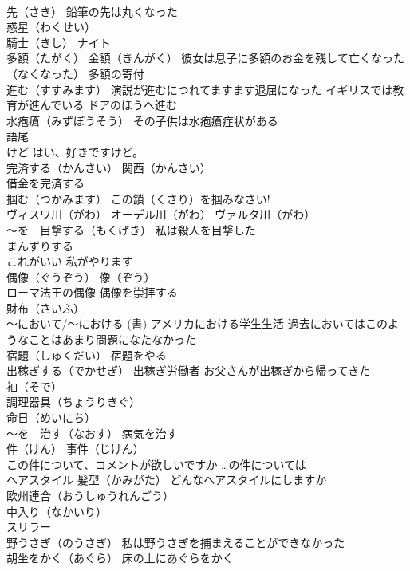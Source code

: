 \documentclass[8pt]{extreport}
\begin{document}
\begin{CJK}{UTF8}{min}
\\	先（さき） 鉛筆の先は丸くなった
\\	惑星（わくせい） 
\\	騎士（きし） ナイト
\\	多額（たがく） 金額（きんがく） 彼女は息子に多額のお金を残して亡くなった（なくなった） 多額の寄付
\\	進む（すすみます） 演説が進むにつれてますます退屈になった イギリスでは教育が進んでいる ドアのほうへ進む
\\	水疱瘡（みずぼうそう） その子供は水疱瘡症状がある
\\	語尾 
\\	けど はい、好きですけど。
\\	完済する（かんさい） 関西（かんさい）
\\	借金を完済する
\\	掴む（つかみます） この鎖（くさり）を掴みなさい!
\\	ヴィスワ川（がわ） オーデル川（がわ） ヴァルタ川（がわ）
\\	～を　目撃する（もくげき） 私は殺人を目撃した
\\	まんずりする
\\	これがいい 私がやります
\\	偶像（ぐうぞう） 像（ぞう）
\\	ローマ法王の偶像 偶像を崇拝する
\\	財布（さいふ）
\\	～において/～における (書) アメリカにおける学生生活 過去においてはこのようなことはあまり問題になたなかった
\\	宿題（しゅくだい） 宿題をやる
\\	出稼ぎする（でかせぎ） 出稼ぎ労働者 お父さんが出稼ぎから帰ってきた
\\	袖（そで）
\\	調理器具（ちょうりきぐ）
\\	命日（めいにち）
\\	～を　治す（なおす） 病気を治す
\\	件（けん） 事件（じけん）
\\	この件について、コメントが欲しいですか …の件については
\\	ヘアスタイル 髪型（かみがた） どんなヘアスタイルにしますか
\\	欧州連合（おうしゅうれんごう）
\\	中入り（なかいり）
\\	スリラー
\\	野うさぎ（のうさぎ） 私は野うさぎを捕まえることができなかった
\\	胡坐をかく（あぐら） 床の上にあぐらをかく

\end{CJK}
\end{document}

